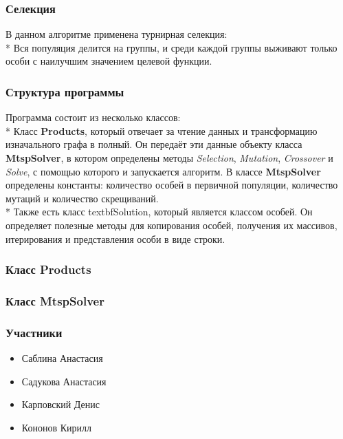 \documentclass{beamer}
\begin{document}
\begin{frame}
    \frametitle{Селекция}
    В данном алгоритме применена турнирная селекция:\\*
    Вся популяция делится на группы, и среди каждой группы
    выживают только особи с наилучшим значением целевой функции.
\end{frame}
\begin{frame}
    \frametitle{Структура программы}
    Программа состоит из несколько классов:\\*
    Класс \textbf{Products}, который отвечает за чтение данных и
    трансформацию изначального графа в полный. Он передаёт эти данные
    объекту класса
    \textbf{MtspSolver}, в котором определены методы
    \textit{Selection}, \textit{Mutation},
    \textit{Crossover} и \textit{Solve}, с помощью которого и запускается алгоритм.
    В классе \textbf{MtspSolver} определены константы: количество
    особей в первичной популяции, количество мутаций и количество
    скрещиваний. \\*
    Также есть класс textbf{Solution}, который является классом особей.
    Он определяет полезные методы для копирования особей, получения 
    их массивов, итерирования и представления особи в виде строки.
\end{frame}
\begin{frame}[fragile]
\frametitle{Класс Products}

\end{frame}
\begin{frame}[fragile]
\frametitle{Класс MtspSolver}

\end{frame}
\begin{frame}[fragile]

\end{frame}
\begin{frame}[fragile]

\end{frame}
\begin{frame}
\frametitle{Участники}
\begin{itemize}
    \item Саблина Анастасия
    \item Садукова Анастасия
    \item Карповский Денис
    \item Кононов Кирилл
\end{itemize}
\end{frame}
\end{document}
